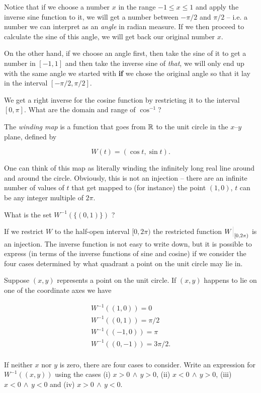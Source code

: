 Notice that if we choose a number $x$ in the range $-1 \leq x \leq 1$ and apply
the inverse sine function to it, we will get a number between $-\pi/2$ and 
$\pi/2$ -- i.e. a number we can interpret as an \emph{angle} in radian measure.
If we then proceed to calculate the sine of this angle, we will get back our
original number $x$.

On the other hand, if we choose an angle first, then take the sine of it to
get a number in $[-1,1]$ and then take the inverse sine of \emph{that},
we will only end up with the same angle we started with {\bf if} 
we chose the original angle
so that it lay in the interval $[-\pi/2, \pi/2]$.

\begin{exer}
We get a right inverse for the cosine function by restricting it to
the interval $[0,\pi]$.  What are the domain and range of $\cos^{-1}$?
\end{exer} 

The \emph{winding map} is a function that goes 
from ${\mathbb R}$ to the unit circle in the $x$--$y$ plane, defined by

\[ W(t) = (\cos{t}, \sin{t}). \]

One can think of this map as literally winding the infinitely long
real line around and around the circle.   Obviously, this is not an
injection -- there are an infinite number of values of $t$ that 
get mapped to (for instance) the point $(1,0)$, $t$ can be any integer
multiple of $2\pi$.

\begin{exer}
What is the set $W^{-1}(\{(0,1)\})$ ?
\end{exer}

If we restrict $W$ to the half-open interval $[0, 2\pi)$ the restricted
function $\restrict{W}{[0, 2\pi)}$ is an injection.  The inverse function is 
not easy to write down, but it is possible to express (in terms 
of the inverse functions of sine and cosine) if we consider the 
four cases determined by what quadrant a point on the unit circle 
may lie in.

\begin{exer}
Suppose $(x,y)$ represents a point on the unit circle.  If $(x,y)$ happens
to lie on one of the coordinate axes we have 

\begin{gather*}
W^{-1}((1,0)) = 0\\
W^{-1}((0,1)) = \pi/2\\
W^{-1}((-1,0)) = \pi\\
W^{-1}((0,-1)) = 3\pi/2.\\
\end{gather*}

If neither $x$ nor $y$ is zero, there are four cases to consider.
Write an expression for $W^{-1}((x,y))$ using the cases 
(i) $x>0 \, \land \, y>0$, 
(ii) $x<0 \, \land \, y>0$, 
(iii) $x<0 \, \land \, y<0$ and  
(iv) $x>0 \, \land \, y<0$. 

\end{exer}


